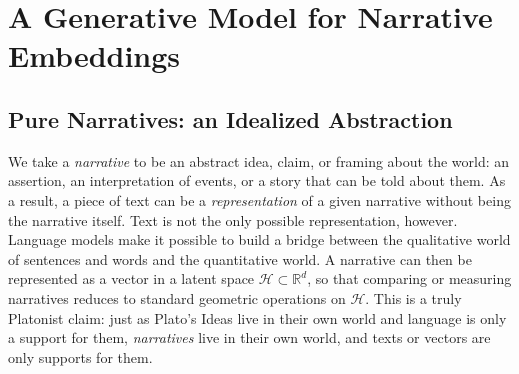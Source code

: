 \documentclass[
  journal=medium,
  manuscript=article-type,
  year=2025,
  volume=1,
]{cup-journal}
\begin{document}

 

\section{A Generative Model for Narrative Embeddings}
\label{sec:model}



\subsection{Pure Narratives: an Idealized Abstraction}
\label{sec:naratives:embedding}

We take a \emph{narrative} to be an abstract idea, claim, or framing about the
world: an assertion, an interpretation of events, or a story that can be told
about them. As a result, a piece of text can be a \emph{representation} of a
given narrative without being the narrative itself. Text is not the only
possible representation, however. Language models make it possible to build a
bridge between the qualitative world of sentences and words and the
quantitative world. A narrative can then be represented as
a vector in a latent space $\mathcal H \subset \mathbb R^d$, so that comparing
or measuring narratives reduces to standard geometric operations on
$\mathcal H$.  This is a truly Platonist
claim: just as Plato's Ideas live in their own world and language is only a
support for them, \emph{narratives} live in their own world, and texts or
vectors are only supports for them.
\end{document}
